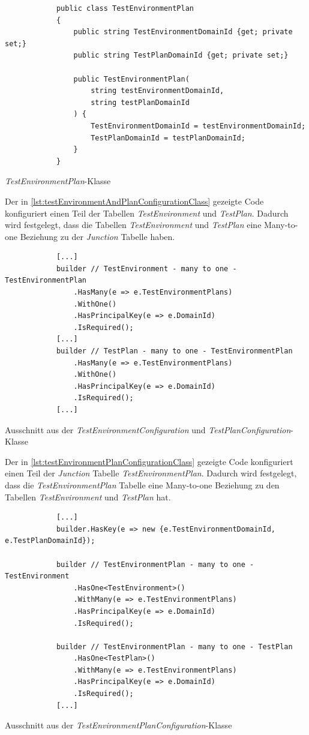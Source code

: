 \documentclass[a4paper, fontsize=11pt, parskip=half, twoside, headings=openright]{scrreprt}
\begin{document}
	\begin{listing}[ht]
		\begin{verbatim}
			public class TestEnvironmentPlan
			{
				public string TestEnvironmentDomainId {get; private set;}
				public string TestPlanDomainId {get; private set;}
				
				public TestEnvironmentPlan(
					string testEnvironmentDomainId, 
					string testPlanDomainId
				) {
					TestEnvironmentDomainId = testEnvironmentDomainId;
					TestPlanDomainId = testPlanDomainId;
				}
			}
		\end{verbatim}
		\caption{\emph{TestEnvironmentPlan}-Klasse}
		\label{lst:testEnvironmentPlanClass}
	\end{listing}
	
	Der in \autoref{lst:testEnvironmentAndPlanConfigurationClass} gezeigte Code konfiguriert einen Teil der Tabellen \emph{TestEnvironment} und \emph{TestPlan}.
	Dadurch wird festgelegt, dass die Tabellen \emph{TestEnvironment} und \emph{TestPlan} eine Many-to-one Beziehung zu der \emph{Junction} Tabelle haben.
	
	\begin{listing}[ht]
		\begin{verbatim}
			[...]	
			builder // TestEnvironment - many to one - TestEnvironmentPlan
				.HasMany(e => e.TestEnvironmentPlans)
				.WithOne()
				.HasPrincipalKey(e => e.DomainId)
				.IsRequired();
			[...]	
			builder // TestPlan - many to one - TestEnvironmentPlan
				.HasMany(e => e.TestEnvironmentPlans)
				.WithOne()
				.HasPrincipalKey(e => e.DomainId)
				.IsRequired();							
			[...]
		\end{verbatim}
		\caption{Ausschnitt aus der \emph{TestEnvironmentConfiguration} und \emph{TestPlanConfiguration}-Klasse}
		\label{lst:testEnvironmentAndPlanConfigurationClass}
	\end{listing}

	Der in \autoref{lst:testEnvironmentPlanConfigurationClass} gezeigte Code konfiguriert einen Teil der \emph{Junction} Tabelle \emph{TestEnvironmentPlan}.
	Dadurch wird festgelegt, dass die \emph{TestEnvironmentPlan} Tabelle eine Many-to-one Beziehung zu den Tabellen \emph{TestEnvironment} und \emph{TestPlan} hat.

	\begin{listing}[ht]
		\begin{verbatim}
			[...]			
			builder.HasKey(e => new {e.TestEnvironmentDomainId, e.TestPlanDomainId});
			
			builder // TestEnvironmentPlan - many to one - TestEnvironment
				.HasOne<TestEnvironment>()
				.WithMany(e => e.TestEnvironmentPlans)
				.HasPrincipalKey(e => e.DomainId)
				.IsRequired();
				
			builder // TestEnvironmentPlan - many to one - TestPlan
				.HasOne<TestPlan>()
				.WithMany(e => e.TestEnvironmentPlans)
				.HasPrincipalKey(e => e.DomainId)
				.IsRequired();				
			[...]
		\end{verbatim}
		\caption{Ausschnitt aus der \emph{TestEnvironmentPlanConfiguration}-Klasse}
		\label{lst:testEnvironmentPlanConfigurationClass}
	\end{listing}
	
\end{document}
